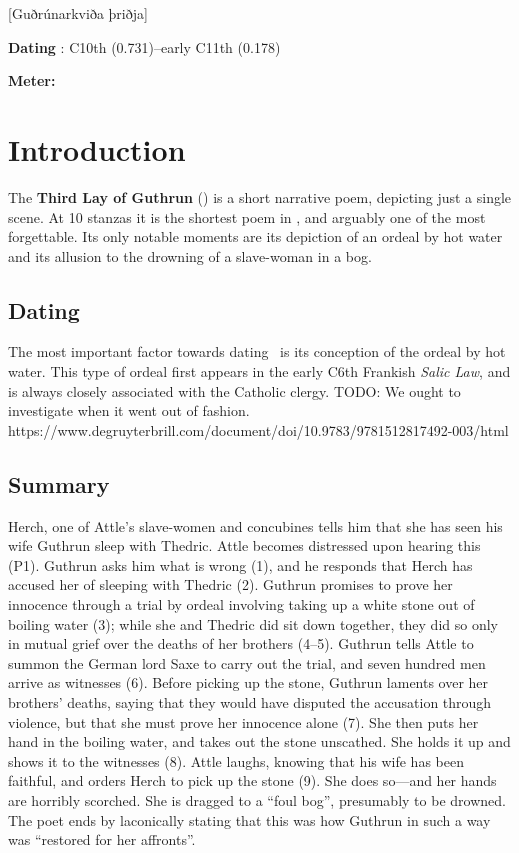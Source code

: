 [Guðrúnarkviða þriðja]
\def\thisBookCode{GudrunThree}

\begin{flushright}%
\textbf{Dating} \parencite{Sapp2022}: C10th (0.731)–early C11th (0.178)

\textbf{Meter:} \Fornyrdislag%
\end{flushright}

\section{Introduction}

The \textbf{Third Lay of Guthrun} (\GudrunThree) is a short narrative poem, depicting just a single scene.  At 10 stanzas it is the shortest poem in \Regius, and arguably one of the most forgettable.  Its only notable moments are its depiction of an ordeal by hot water and its allusion to the drowning of a slave-woman in a bog.

\subsection{Dating}

The most important factor towards dating \GudrunThree\ is its conception of the ordeal by hot water.  This type of ordeal first appears in the early C6th Frankish \emph{Salic Law}, and is always closely associated with the Catholic clergy.  TODO: We ought to investigate when it went out of fashion.  https://www.degruyterbrill.com/document/doi/10.9783/9781512817492-003/html

\subsection{Summary}

Herch, one of Attle’s slave-women and concubines tells him that she has seen his wife Guthrun sleep with Thedric. Attle becomes distressed upon hearing this (P1). Guthrun asks him what is wrong (1), and he responds that Herch has accused her of sleeping with Thedric (2). Guthrun promises to prove her innocence through a trial by ordeal involving taking up a white stone out of boiling water (3); while she and Thedric did sit down together, they did so only in mutual grief over the deaths of her brothers (4–5).  Guthrun tells Attle to summon the German lord Saxe to carry out the trial, and seven hundred men arrive as witnesses (6). Before picking up the stone, Guthrun laments over her brothers’ deaths, saying that they would have disputed the accusation through violence, but that she must prove her innocence alone (7). She then puts her hand in the boiling water, and takes out the stone unscathed. She holds it up and shows it to the witnesses (8). Attle laughs, knowing that his wife has been faithful, and orders Herch to pick up the stone (9). She does so—and her hands are horribly scorched. She is dragged to a “foul bog”, presumably to be drowned. The poet ends by laconically stating that this was how Guthrun in such a way was “restored for her affronts”.

